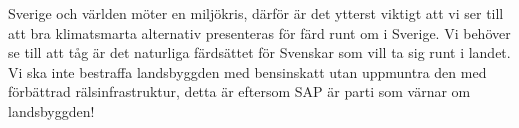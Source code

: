 \documentclass[motion]{iksdagen-handlingar}
\begin{document}
\makeheader%

\makecontent%

Sverige och världen möter en miljökris, därför är det ytterst viktigt att vi ser till att bra klimatsmarta alternativ presenteras för färd runt om i Sverige. Vi behöver se till att tåg är det naturliga färdsättet för Svenskar som vill ta sig runt i landet. Vi ska inte bestraffa landsbyggden med bensinskatt utan uppmuntra den med förbättrad rälsinfrastruktur, detta är eftersom SAP är parti som värnar om landsbyggden!

\makesignatures%
\end{document}
